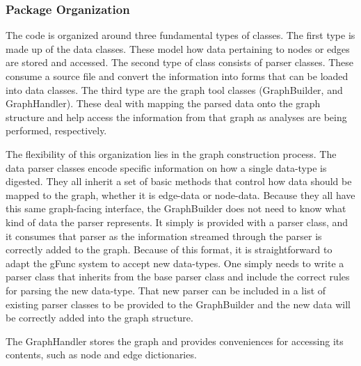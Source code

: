 \subsubsection{Package Organization}
The code is organized around three fundamental types of classes.
The first type is made up of the data classes.
These model how data pertaining to nodes or edges are stored and accessed.
The second type of class consists of parser classes.
These consume a source file and convert the information into forms that can be loaded into data classes.
The third type are the graph tool classes (GraphBuilder, and GraphHandler).
These deal with mapping the parsed data onto the graph structure and help access the information from that graph as analyses are being performed, respectively.


The flexibility of this organization lies in the graph construction process.
The data parser classes encode specific information on how a single data-type is digested.
They all inherit a set of basic methods that control how data should be mapped to the graph, whether it is edge-data or node-data.
Because they all have this same graph-facing interface, the GraphBuilder does not need to know what kind of data the parser represents.
It simply is provided with a parser class, and it consumes that parser as the information streamed through the parser is correctly added to the graph.
Because of this format, it is straightforward to adapt the \gls{gFunc} system to accept new data-types.
One simply needs to write a parser class that inherits from the base parser class and include the correct rules for parsing the new data-type.
That new parser can be included in a list of existing parser classes to be provided to the GraphBuilder and the new data will be correctly added into the graph structure.

The GraphHandler stores the graph and provides conveniences for accessing its contents, such as node and edge dictionaries.


